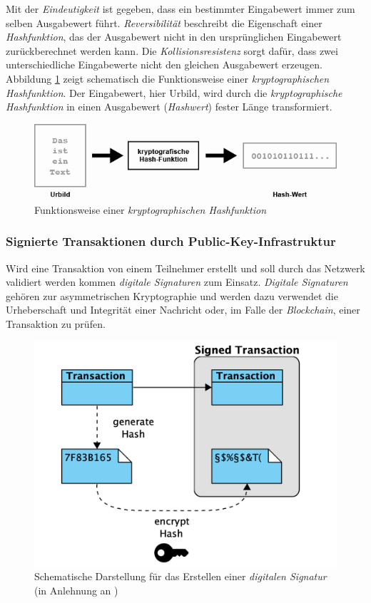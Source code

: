 Mit der \textit{Eindeutigkeit} ist gegeben, dass ein bestimmter Eingabewert immer zum selben Ausgabewert führt. \textit{Reversibilität} beschreibt die Eigenschaft einer \textit{Hashfunktion}, das der Ausgabewert nicht in den ursprünglichen Eingabewert zurückberechnet werden kann. Die \textit{Kollisionsresistenz} sorgt dafür, dass zwei unterschiedliche Eingabewerte nicht den gleichen Ausgabewert erzeugen. Abbildung \ref{fig:schema-hash-function} zeigt schematisch die Funktionsweise einer \textit{kryptographischen Hashfunktion}. Der Eingabewert, hier Urbild, wird durch die \textit{kryptographische Hashfunktion} in einen Ausgabewert (\textit{Hashwert}) fester Länge transformiert.

\begin{figure}[H]
	\centering
	\includegraphics[width=1.0\linewidth]{pictures/schema-hash-function}
	\caption[Funktionsweise einer \textit{kryptographischen Hashfunktion}]{Funktionsweise einer \textit{kryptographischen Hashfunktion} \citep{Schaerer2019}}
	\label{fig:schema-hash-function}
\end{figure}

\subsubsection{Signierte Transaktionen durch Public-Key-Infrastruktur}
Wird eine Transaktion von einem Teilnehmer erstellt und soll durch das Netzwerk validiert werden kommen \textit{digitale Signaturen} zum Einsatz. \textit{Digitale Signaturen} gehören zur asymmetrischen Kryptographie und werden dazu verwendet die Urheberschaft und Integrität einer Nachricht oder, im Falle der \textit{Blockchain}, einer Transaktion zu prüfen.\citep{Beutelspacher2010, Menezes1997}

\begin{figure}[H]
	\centering
	\includegraphics[width=0.7\linewidth]{pictures/digital-signatures-create}
	\caption[Erstellen einer \textit{digitalen Signatur}]{Schematische Darstellung für das Erstellen einer \textit{digitalen Signatur} (in Anlehnung an \citet{Drescher2017})}
	\label{fig:digital-signatures-create}
\end{figure}

